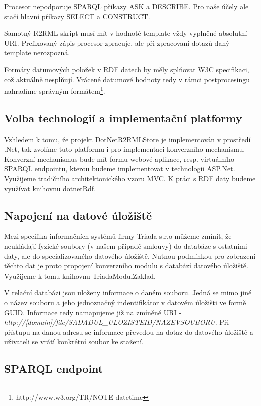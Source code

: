 Procesor nepodporuje SPARQL příkazy ASK a DESCRIBE. Pro naše účely ale stačí hlavní příkazy SELECT a CONSTRUCT.

Samotný R2RML skript musí mít v hodnotě template vždy vyplněné absolutní URI. Prefixovaný zápis procesor zpracuje, ale při zpracovaní dotazů daný template nerozpozná.

Formáty datumových položek v RDF datech by měly splňovat W3C specifikaci, což aktuálně nesplňují. Vrácené datumové hodnoty tedy v rámci postprocesingu nahradíme správným formátem\footnote{http://www.w3.org/TR/NOTE-datetime}. 

\subsection{Volba technologií a implementační platformy}

Vzhledem k tomu, že projekt DotNetR2RMLStore je implementován v prostředí .Net, tak zvolíme tuto platformu i pro implementaci konverzního mechanismu. Konverzní mechanismus bude mít formu webové aplikace, resp. virtuálního SPARQL endpointu, kterou budeme implementovat v technologii ASP.Net. Využijeme tradičního architektonického vzoru MVC. K práci s RDF daty budeme využívat knihovnu dotnetRdf.

\subsection{Napojení na datové úložiště}

Mezi specifika informačních systémů firmy Triada s.r.o můžeme zmínit, že neukládají fyzické soubory (v našem případě smlouvy) do databáze s ostatními daty, ale do specializovaného datového úložiště. Nutnou podmínkou pro zobrazení těchto dat je proto propojení konverzního modulu s databází datového úložiště. Využijeme k tomu knihovnu TriadaModulZaklad.

V relační databázi jsou uloženy informace o daném souboru. Jedná se mimo jiné o název souboru a jeho jednoznačný indentifikátor v datovém úložišti ve formě GUID. Informace tedy namapujeme již na zmíněné URI -\\\textit{http://[domain]/file/{SADADUL\_ULOZISTEID}/{NAZEVSOUBORU}}. Při přístupu na danou adresu se informace převedou na dotaz do datového úložiště a uživateli se vrátí konkrétní soubor ke stažení.

\subsection{SPARQL endpoint}

